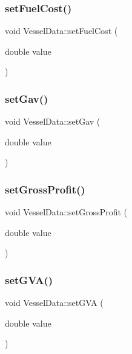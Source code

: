 \mbox{\label{class_vessel_data_a24a615f0950cf5ce9ae4668ff00a0475}} 
\subsubsection{\texorpdfstring{setFuelCost()}{setFuelCost()}}
{\footnotesize\ttfamily void Vessel\+Data\+::set\+Fuel\+Cost (\begin{DoxyParamCaption}\item[{double}]{value }\end{DoxyParamCaption})}

\mbox{\label{class_vessel_data_a7accbc88145201e34212cd633e5d38b8}} 
\subsubsection{\texorpdfstring{setGav()}{setGav()}}
{\footnotesize\ttfamily void Vessel\+Data\+::set\+Gav (\begin{DoxyParamCaption}\item[{double}]{value }\end{DoxyParamCaption})}

\mbox{\label{class_vessel_data_a79c841b831bf1c3b503adb0d048ac4fe}} 
\subsubsection{\texorpdfstring{setGrossProfit()}{setGrossProfit()}}
{\footnotesize\ttfamily void Vessel\+Data\+::set\+Gross\+Profit (\begin{DoxyParamCaption}\item[{double}]{value }\end{DoxyParamCaption})}

\mbox{\label{class_vessel_data_a0514e238c51f7f7f500a5c57b6a8ce44}} 
\subsubsection{\texorpdfstring{setGVA()}{setGVA()}}
{\footnotesize\ttfamily void Vessel\+Data\+::set\+G\+VA (\begin{DoxyParamCaption}\item[{double}]{value }\end{DoxyParamCaption})}

